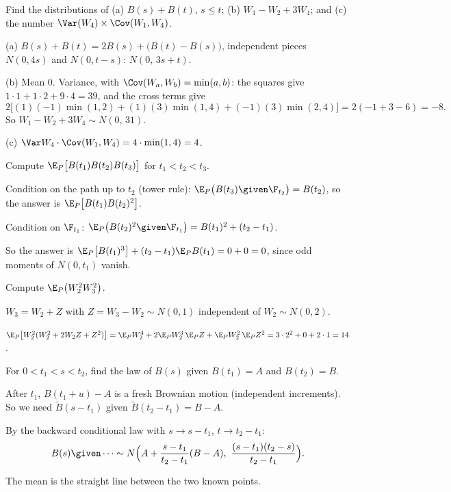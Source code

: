 \begin{problem}
Find the distributions of (a) $B(s)+B(t)$, $s\le t$; (b) $W_1-W_2+3W_4$; and (c) the number $\Var(W_4)\times\Cov(W_1,W_4)$.
\begin{steps}
  \item (a) $B(s)+B(t)=2B(s)+\big(B(t)-B(s)\big)$, independent pieces $N(0,4s)$ and $N(0,t-s)$: $N(0,\,3s+t)$.
  \item (b) Mean $0$. Variance, with $\Cov(W_a,W_b)=\min(a,b)$: the squares give $1\cdot1+1\cdot2+9\cdot4=39$, and the cross terms give
  \[
    2\big[(1)(-1)\min(1,2)+(1)(3)\min(1,4)+(-1)(3)\min(2,4)\big]=2(-1+3-6)=-8 .
  \]
  So $W_1-W_2+3W_4\sim N(0,\,31)$.
  \item (c) $\Var W_4\cdot\Cov(W_1,W_4)=4\cdot\min(1,4)=4$.
\end{steps}
\end{problem}

\begin{problem}
Compute $\E_P\big[B(t_1)B(t_2)B(t_3)\big]$ for $t_1<t_2<t_3$.
\begin{steps}
  \item Condition on the path up to $t_2$ (tower rule): $\E_P\big(B(t_3)\given\F_{t_2}\big)=B(t_2)$, so the answer is $\E_P\big[B(t_1)B(t_2)^2\big]$.
  \item Condition on $\F_{t_1}$: $\E_P\big(B(t_2)^2\given\F_{t_1}\big)=B(t_1)^2+(t_2-t_1)$.
  \item So the answer is $\E_P\big[B(t_1)^3\big]+(t_2-t_1)\E_PB(t_1)=0+0=0$, since odd moments of $N(0,t_1)$ vanish.
\end{steps}
\end{problem}

\begin{problem}
Compute $\E_P\big(W_2^2W_3^2\big)$.
\begin{steps}
  \item $W_3=W_2+Z$ with $Z=W_3-W_2\sim N(0,1)$ independent of $W_2\sim N(0,2)$.
  \item $\E_P\big[W_2^2(W_2^2+2W_2Z+Z^2)\big]=\E_PW_2^4+2\E_PW_2^3\,\E_PZ+\E_PW_2^2\,\E_PZ^2=3\cdot2^2+0+2\cdot1=14$.
\end{steps}
\end{problem}

\begin{problem}
For $0<t_1<s<t_2$, find the law of $B(s)$ given $B(t_1)=A$ and $B(t_2)=B$.
\begin{steps}
  \item After $t_1$, $B(t_1+u)-A$ is a fresh Brownian motion (independent increments). So we need $\tilde B(s-t_1)$ given $\tilde B(t_2-t_1)=B-A$.
  \item By the backward conditional law with $s\to s-t_1$, $t\to t_2-t_1$:
  \[
    B(s)\given\dots\sim N\Big(A+\frac{s-t_1}{t_2-t_1}(B-A),\ \frac{(s-t_1)(t_2-s)}{t_2-t_1}\Big).
  \]
\end{steps}
The mean is the straight line between the two known points.
\end{problem}

